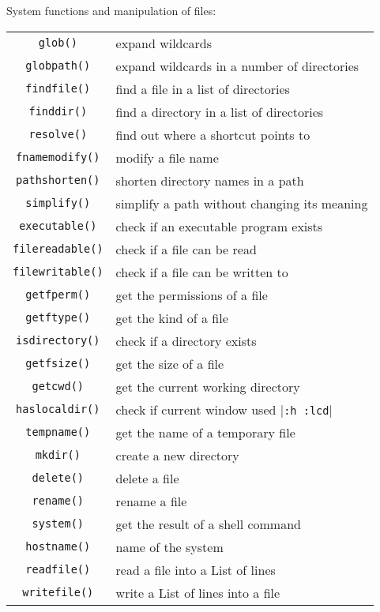 System functions and manipulation of files:
\label{system-functions}
\label{file-functions}
\begin{center} \begin{tabular}{c l}
				\verb!glob()! & expand wildcards \\
				\verb!globpath()! & expand wildcards in a number of directories \\
				\verb!findfile()! & find a file in a list of directories \\
				\verb!finddir()! & find a directory in a list of directories \\
				\verb!resolve()! & find out where a shortcut points to \\
				\verb!fnamemodify()! & modify a file name \\
				\verb!pathshorten()! & shorten directory names in a path \\
				\verb!simplify()! & simplify a path without changing its meaning \\
				\verb!executable()! & check if an executable program exists \\
				\verb!filereadable()! & check if a file can be read \\
				\verb!filewritable()! & check if a file can be written to \\
				\verb!getfperm()! & get the permissions of a file \\
				\verb!getftype()! & get the kind of a file \\
				\verb!isdirectory()! & check if a directory exists \\
				\verb!getfsize()! & get the size of a file \\
				\verb!getcwd()! & get the current working directory \\
				\verb!haslocaldir()! & check if current window used |\verb!:h :lcd!| \\
				\verb!tempname()! & get the name of a temporary file \\
				\verb!mkdir()! & create a new directory \\
				\verb!delete()! & delete a file \\
				\verb!rename()! & rename a file \\
				\verb!system()! & get the result of a shell command \\
				\verb!hostname()! & name of the system \\
				\verb!readfile()! & read a file into a List of lines \\
				\verb!writefile()! & write a List of lines into a file \\
\end{tabular} \end{center}

